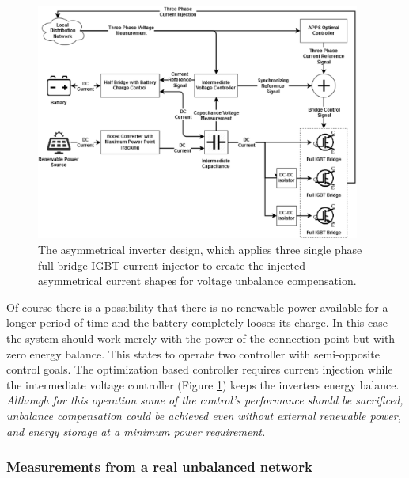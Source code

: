         \begin{figure}[ht]
        \centering
        \includegraphics[width=0.95\textwidth]{Unblance_EPS_Pics/inverter.eps}
        \caption{The asymmetrical inverter design, which applies three single phase full bridge IGBT current injector to create the injected asymmetrical current shapes for voltage unbalance compensation. }
        \label{fig:inv}
        \end{figure}

        Of course there is a possibility that there is no renewable power available for a longer period of time and the battery completely looses its charge. In this case the system should work merely with the power of the connection point but with zero energy balance. This states to operate two controller with semi-opposite control goals. The optimization based controller requires current injection while the intermediate voltage controller (Figure \ref{fig:inv}) keeps the inverters energy balance.\emph{ Although for this operation some of the control's performance should be sacrificed, unbalance compensation could be achieved even without external renewable power, and energy storage at a minimum power requirement.}

        \subsubsection{Measurements from a real unbalanced network}\label{VUB:sec:Measurement}

